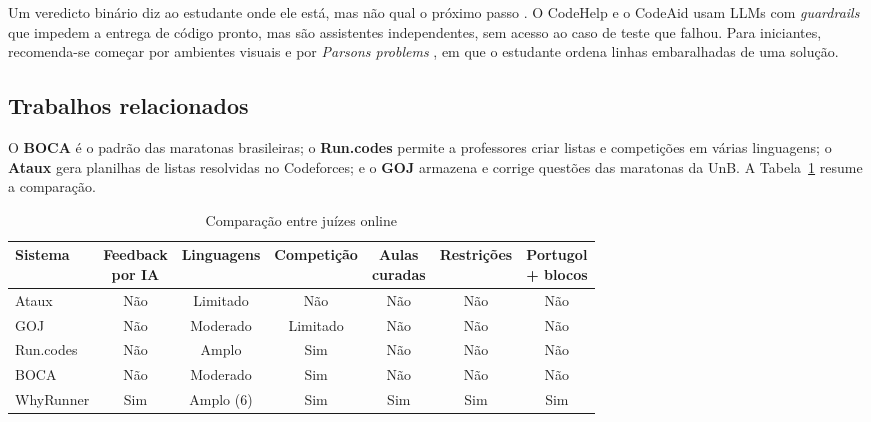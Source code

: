 \documentclass[12pt]{article}
\begin{document}
Um veredicto binário diz ao estudante onde ele está, mas não qual o próximo passo \cite{hattie2007power,keuning2018systematic}. O CodeHelp \cite{liffiton2023codehelp} e o CodeAid \cite{kazemitabaar2024codeaid} usam LLMs com \emph{guardrails} que impedem a entrega de código pronto, mas são assistentes independentes, sem acesso ao caso de teste que falhou. Para iniciantes, recomenda-se começar por ambientes visuais \cite{weintrop2015block} e por \emph{Parsons problems} \cite{parsons2006puzzles}, em que o estudante ordena linhas embaralhadas de uma solução.

\subsection{Trabalhos relacionados}\label{sec:relacionados}

O \textbf{BOCA} \cite{de2004boca} é o padrão das maratonas brasileiras; o \textbf{Run.codes} \cite{runcodes2024} permite a professores criar listas e competições em várias linguagens; o \textbf{Ataux} \cite{silva2021ataux} gera planilhas de listas resolvidas no Codeforces; e o \textbf{GOJ} \cite{lima2022gamma} armazena e corrige questões das maratonas da UnB. A Tabela~\ref{tab:comparacao} resume a comparação.

\begin{table}[!htb]
\centering
\caption{Comparação entre juízes online}
\label{tab:comparacao}
\footnotesize
\setlength{\tabcolsep}{4pt}
\renewcommand{\arraystretch}{1.25}
\begin{tabular}{|l|c|c|c|c|c|c|}
\hline
\rule{0pt}{5.6ex}\textbf{Sistema} & \shortstack{\textbf{Feedback}\\\textbf{por IA}} & \textbf{Linguagens} & \textbf{Competição} & \shortstack{\textbf{Aulas}\\\textbf{curadas}} & \textbf{Restrições} & \shortstack{\textbf{Portugol}\\\textbf{+ blocos}} \\
\hline
Ataux      & Não & Limitado   & Não      & Não & Não & Não \\
GOJ        & Não & Moderado   & Limitado & Não & Não & Não \\
Run.codes  & Não & Amplo      & Sim      & Não & Não & Não \\
BOCA       & Não & Moderado   & Sim      & Não & Não & Não \\
WhyRunner  & Sim & Amplo (6)  & Sim      & Sim & Sim & Sim \\
\hline
\end{tabular}
\end{table}
\end{document}

